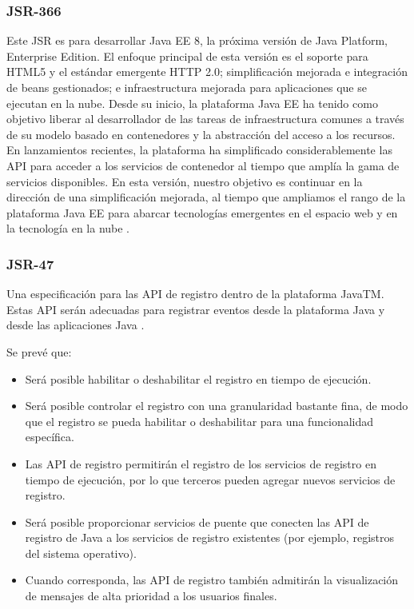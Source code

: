 \begin{spacing}{1.5}
		\subsubsection{JSR-366}
			Este JSR es para desarrollar Java EE 8, la próxima versión de Java Platform, Enterprise Edition.
			El enfoque principal de esta versión es el soporte para HTML5 y el estándar emergente HTTP 2.0; simplificación mejorada e integración de beans gestionados; e infraestructura mejorada para aplicaciones que se ejecutan en la nube.
			Desde su inicio, la plataforma Java EE ha tenido como objetivo liberar al desarrollador de las tareas de infraestructura comunes a través de su modelo basado en contenedores y la abstracción del acceso a los recursos. En lanzamientos recientes, la plataforma ha simplificado considerablemente las API para acceder a los servicios de contenedor al tiempo que amplía la gama de servicios disponibles. En esta versión, nuestro objetivo es continuar en la dirección de una simplificación mejorada, al tiempo que ampliamos el rango de la plataforma Java EE para abarcar tecnologías emergentes en el espacio web y en la tecnología en la nube \cite{chap2_jsr_366}.
		\subsubsection{JSR-47}
			Una especificación para las API de registro dentro de la plataforma JavaTM. Estas API serán adecuadas para registrar eventos desde la plataforma Java y desde las aplicaciones Java \cite{chap2_jsr_47}.
			
			Se prevé que:
			\begin{itemize}
				\item Será posible habilitar o deshabilitar el registro en tiempo de ejecución.
				\item Será posible controlar el registro con una granularidad bastante fina, de modo que el registro se pueda habilitar o deshabilitar para una funcionalidad específica.
				\item Las API de registro permitirán el registro de los servicios de registro en tiempo de ejecución, por lo que terceros pueden agregar nuevos servicios de registro.
				\item Será posible proporcionar servicios de puente que conecten las API de registro de Java a los servicios de registro existentes (por ejemplo, registros del sistema operativo).
				\item Cuando corresponda, las API de registro también admitirán la visualización de mensajes de alta prioridad a los usuarios finales.
			\end{itemize}

\end{spacing}
